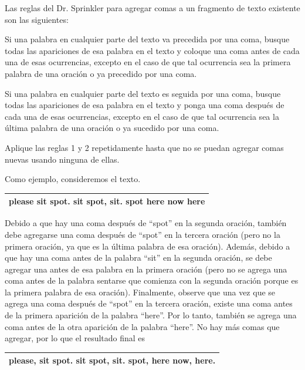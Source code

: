 \documentclass[12pt]{article}
\newcommand{\nl}{\vspace{0.3cm}}
\begin{document}
\nl

Las reglas del Dr. Sprinkler para agregar comas a un fragmento de texto existente son las siguientes:

\nl

Si una palabra en cualquier parte del texto va precedida por una coma, busque todas las apariciones de esa palabra en el texto y coloque una coma antes de cada una de esas ocurrencias, excepto en el caso de que tal ocurrencia sea la primera palabra de una oración o ya precedido por una coma.

\nl

Si una palabra en cualquier parte del texto es seguida por una coma, busque todas las apariciones de esa palabra en el texto y ponga una coma después de cada una de esas ocurrencias, excepto en el caso de que tal ocurrencia sea la última palabra de una oración o ya sucedido por una coma.

\nl

Aplique las reglas 1 y 2 repetidamente hasta que no se puedan agregar comas nuevas usando ninguna de ellas.

\nl

Como ejemplo, consideremos el texto.

\nl

\begin{tabular}{|c|}
	\hline please sit spot. sit spot, sit. spot here now here \\ 
	\hline 
\end{tabular} 

\nl

Debido a que hay una coma después de “spot” en la segunda oración, también debe agregarse una coma después de “spot” en la tercera oración (pero no la primera oración, ya que es la última palabra de esa oración). Además, debido a que hay una coma antes de la palabra “sit” en la segunda oración, se debe agregar una antes de esa palabra en la primera oración (pero no se agrega una coma antes de la palabra sentarse que comienza con la segunda oración porque es la primera palabra de esa oración). Finalmente, observe que una vez que se agrega una coma después de “spot” en la tercera oración, existe una coma antes de la primera aparición de la palabra “here”. Por lo tanto, también se agrega una coma antes de la otra aparición de la palabra “here”. No hay más comas que agregar, por lo que el resultado final es

\nl

\begin{tabular}{|c|}
	\hline please, sit spot. sit spot, sit. spot, here now, here. \\ 
	\hline 
\end{tabular} 
\end{document}
